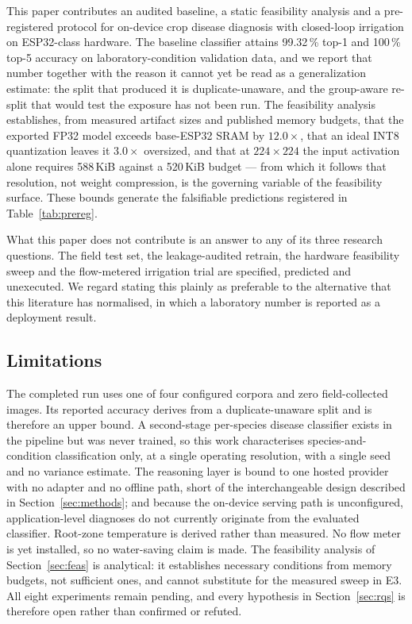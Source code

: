 \documentclass[journal]{IEEEtran}
\begin{document}
This paper contributes an audited baseline, a static feasibility analysis
and a pre-registered protocol for on-device crop disease diagnosis with
closed-loop irrigation on ESP32-class hardware. The baseline classifier
attains 99.32\,\% top-1 and 100\,\% top-5 accuracy on laboratory-condition
validation data, and we report that number together with the reason it
cannot yet be read as a generalization estimate: the split that produced
it is duplicate-unaware, and the group-aware re-split that would test the
exposure has not been run. The feasibility analysis establishes, from
measured artifact sizes and published memory budgets, that the exported
FP32 model exceeds base-ESP32 SRAM by $12.0\times$, that an ideal INT8
quantization leaves it $3.0\times$ oversized, and that at $224\times224$
the input activation alone requires 588\,KiB against a 520\,KiB budget ---
from which it follows that resolution, not weight compression, is the
governing variable of the feasibility surface. These bounds generate the
falsifiable predictions registered in Table~\ref{tab:prereg}.

What this paper does not contribute is an answer to any of its three
research questions. The field test set, the leakage-audited retrain, the
hardware feasibility sweep and the flow-metered irrigation trial are
specified, predicted and unexecuted. We regard stating this plainly as
preferable to the alternative that this literature has normalised, in which
a laboratory number is reported as a deployment result.

\subsection{Limitations}

The completed run uses one of four configured corpora and zero
field-collected images. Its reported accuracy derives from a
duplicate-unaware split and is therefore an upper bound. A second-stage
per-species disease classifier exists in the pipeline but was never
trained, so this work characterises species-and-condition classification
only, at a single operating resolution, with a single seed and no variance
estimate. The reasoning layer is bound to one hosted provider with no
adapter and no offline path, short of the interchangeable design described
in Section~\ref{sec:methods}; and because the on-device serving path is
unconfigured, application-level diagnoses do not currently originate from
the evaluated classifier. Root-zone temperature is derived rather than
measured. No flow meter is yet installed, so no water-saving claim is made.
The feasibility analysis of Section~\ref{sec:feas} is analytical: it
establishes necessary conditions from memory budgets, not sufficient ones,
and cannot substitute for the measured sweep in E3. All eight experiments
remain pending, and every hypothesis in Section~\ref{sec:rqs} is therefore
open rather than confirmed or refuted.
\end{document}
